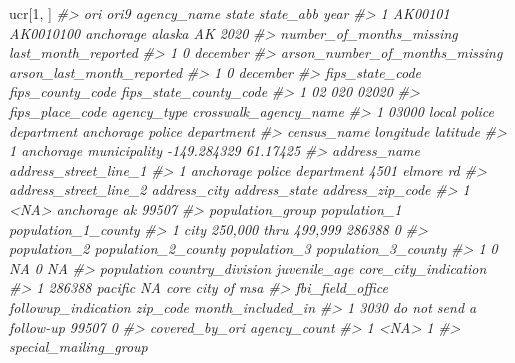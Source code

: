 \documentclass[
]{krantz}
\makeatletter
\newenvironment{Shaded}{\begin{snugshade}}{\end{snugshade}}
\newcommand{\CommentTok}[1]{\textcolor[rgb]{0.37,0.37,0.37}{\textit{#1}}}
\newcommand{\DecValTok}[1]{\textcolor[rgb]{0.06,0.06,0.06}{#1}}
\newcommand{\NormalTok}[1]{#1}
\newenvironment{kframe}{%
\medskip{}
\setlength{\fboxsep}{.8em}
 \def\at@end@of@kframe{}%
 \ifinner\ifhmode%
  \def\at@end@of@kframe{\end{minipage}}%
  \begin{minipage}{\columnwidth}%
 \fi\fi%
 \def\FrameCommand##1{\hskip\@totalleftmargin \hskip-\fboxsep
 \colorbox{shadecolor}{##1}\hskip-\fboxsep
     \hskip-\linewidth \hskip-\@totalleftmargin \hskip\columnwidth}%
 \MakeFramed {\advance\hsize-\width
   \@totalleftmargin\z@ \linewidth\hsize
   \@setminipage}}%
 {\par\unskip\endMakeFramed%
 \at@end@of@kframe}
\renewenvironment{Shaded}{\begin{kframe}}{\end{kframe}}
\makeatother
\begin{document}
\begin{Shaded}
\begin{Highlighting}[]
\NormalTok{ucr[}\DecValTok{1}\NormalTok{, ]}
\CommentTok{\#\textgreater{}       ori      ori9 agency\_name  state state\_abb year}
\CommentTok{\#\textgreater{} 1 AK00101 AK0010100   anchorage alaska        AK 2020}
\CommentTok{\#\textgreater{}   number\_of\_months\_missing last\_month\_reported}
\CommentTok{\#\textgreater{} 1                        0            december}
\CommentTok{\#\textgreater{}   arson\_number\_of\_months\_missing arson\_last\_month\_reported}
\CommentTok{\#\textgreater{} 1                              0                  december}
\CommentTok{\#\textgreater{}   fips\_state\_code fips\_county\_code fips\_state\_county\_code}
\CommentTok{\#\textgreater{} 1              02              020                  02020}
\CommentTok{\#\textgreater{}   fips\_place\_code             agency\_type       crosswalk\_agency\_name}
\CommentTok{\#\textgreater{} 1           03000 local police department anchorage police department}
\CommentTok{\#\textgreater{}              census\_name   longitude latitude}
\CommentTok{\#\textgreater{} 1 anchorage municipality {-}149.284329 61.17425}
\CommentTok{\#\textgreater{}                  address\_name address\_street\_line\_1}
\CommentTok{\#\textgreater{} 1 anchorage police department        4501 elmore rd}
\CommentTok{\#\textgreater{}   address\_street\_line\_2 address\_city address\_state address\_zip\_code}
\CommentTok{\#\textgreater{} 1                  \textless{}NA\textgreater{}    anchorage            ak            99507}
\CommentTok{\#\textgreater{}            population\_group population\_1 population\_1\_county}
\CommentTok{\#\textgreater{} 1 city 250,000 thru 499,999       286388                   0}
\CommentTok{\#\textgreater{}   population\_2 population\_2\_county population\_3 population\_3\_county}
\CommentTok{\#\textgreater{} 1            0                  NA            0                  NA}
\CommentTok{\#\textgreater{}   population country\_division juvenile\_age core\_city\_indication}
\CommentTok{\#\textgreater{} 1     286388          pacific           NA     core city of msa}
\CommentTok{\#\textgreater{}   fbi\_field\_office     followup\_indication zip\_code month\_included\_in}
\CommentTok{\#\textgreater{} 1             3030 do not send a follow{-}up    99507                 0}
\CommentTok{\#\textgreater{}   covered\_by\_ori agency\_count}
\CommentTok{\#\textgreater{} 1           \textless{}NA\textgreater{}            1}
\CommentTok{\#\textgreater{}                                                              special\_mailing\_group}

\end{Highlighting}
\end{Shaded}
\end{document}
